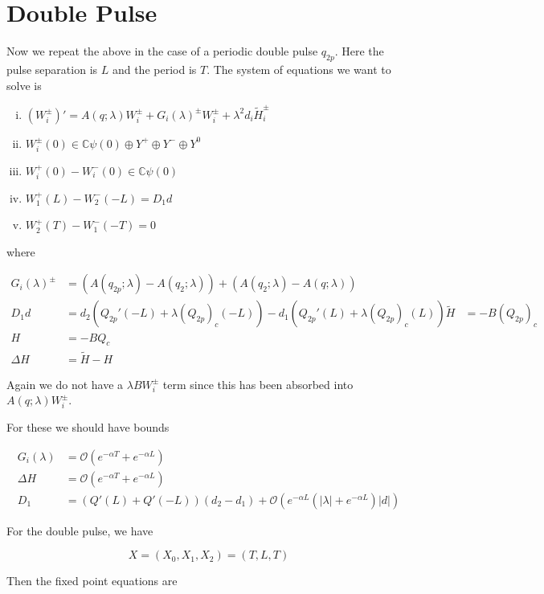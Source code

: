 \documentclass[12pt]{article}
\def\C{{\mathbb C}}
\begin{document}
\section*{Double Pulse}

Now we repeat the above in the case of a periodic double pulse $q_{2p}$. Here the pulse separation is $L$ and the period is $T$. The system of equations we want to solve is

\begin{enumerate}[(i)]
\item $(W_i^\pm)' = A(q; \lambda) W_i^\pm + G_i(\lambda)^\pm W_i^\pm + \lambda^2 d_i \tilde{H}_i^\pm$
\item $W_i^\pm(0) \in \C \psi(0) \oplus Y^+ \oplus Y^- \oplus Y^0$
\item $W_i^+(0) - W_i^-(0) \in \C \psi(0) $
\item $W_1^+(L) - W_2^-(-L) = D_1 d $
\item $W_2^+(T) - W_1^-(-T) = 0$
\end{enumerate}

where

\begin{align*}
G_i(\lambda)^\pm &= (A(q_{2p};\lambda) - A(q_2;\lambda)) + (A(q_{2};\lambda) - A(q;\lambda)) \\
D_1 d &= d_2(Q_{2p}'(-L) + \lambda (Q_{2p})_c(-L)) 
- d_1 ( Q_{2p}'(L) + \lambda (Q_{2p})_c(L) )
\tilde{H} &= -B(Q_{2p})_c \\
H &= -B Q_c \\
\Delta H &= \tilde{H} - H
\end{align*}

Again we do not have a $\lambda B W_i^\pm$ term since this has been absorbed into $A(q; \lambda) W_i^\pm$. 

For these we should have bounds

\begin{align*}
G_i(\lambda) &= \mathcal{O}(e^{-\alpha T} + e^{-\alpha L}) \\
\Delta H &= \mathcal{O}(e^{-\alpha T} + e^{-\alpha L}) \\
D_1 &= ( Q'(L) + Q'(-L) )(d_2 - d_1 ) + \mathcal{O} \left( e^{-\alpha L} \left( |\lambda| +  e^{-\alpha L}  \right) |d| \right)
\end{align*}

For the double pulse, we have

\[
X = (X_0, X_1, X_2) = (T, L, T)
\]

Then the fixed point equations are 
\end{document}
